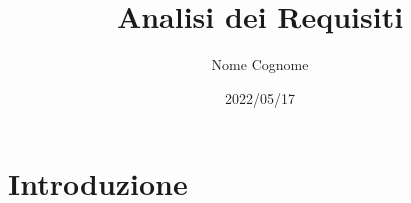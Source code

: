 \documentclass{classes/base}
\title{Analisi dei Requisiti}
\date{2022/05/17}
\author{Nome Cognome}
\begin{document}
	\maketitle
	\newpage
	\tableofcontents

	\newpage
	\section{Introduzione}
	
		
\end{document}

